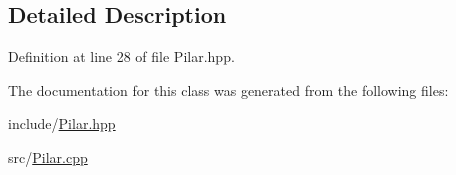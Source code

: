 \subsection{Detailed Description}


Definition at line 28 of file Pilar.\+hpp.



The documentation for this class was generated from the following files\+:\begin{DoxyCompactItemize}
\item 
include/\mbox{\hyperlink{_pilar_8hpp}{Pilar.\+hpp}}\item 
src/\mbox{\hyperlink{_pilar_8cpp}{Pilar.\+cpp}}\end{DoxyCompactItemize}
